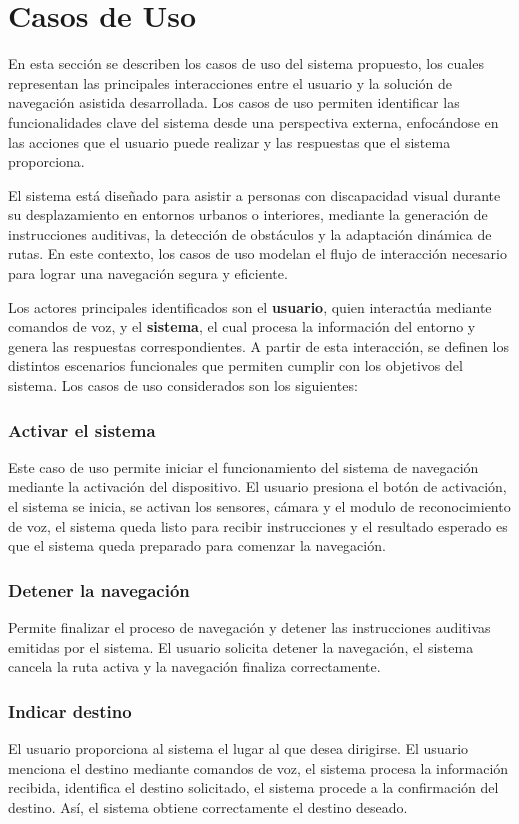 \section{Casos de Uso}
En esta sección se describen los casos de uso del sistema propuesto, los cuales representan las principales interacciones entre el usuario y la solución de navegación asistida desarrollada. Los casos de uso permiten identificar las funcionalidades clave del sistema desde una perspectiva externa, enfocándose en las acciones que el usuario puede realizar y las respuestas que el sistema proporciona.

El sistema está diseñado para asistir a personas con discapacidad visual durante su desplazamiento en entornos urbanos o interiores, mediante la generación de instrucciones auditivas, la detección de obstáculos y la adaptación dinámica de rutas. En este contexto, los casos de uso modelan el flujo de interacción necesario para lograr una navegación segura y eficiente.

Los actores principales identificados son el \textbf{usuario}, quien interactúa mediante comandos de voz, y el \textbf{sistema}, el cual procesa la información del entorno y genera las respuestas correspondientes. A partir de esta interacción, se definen los distintos escenarios funcionales que permiten cumplir con los objetivos del sistema.
Los casos de uso considerados son los siguientes:
\subsubsection{Activar el sistema} 
Este caso de uso permite iniciar el funcionamiento del sistema de navegación mediante la activación del dispositivo.
El usuario presiona el botón de activación, el sistema se inicia, se activan los sensores, cámara y el modulo de reconocimiento de voz, el sistema queda listo para recibir instrucciones y el resultado esperado es que el sistema queda preparado para comenzar la navegación.
\subsubsection{Detener la navegación}
Permite finalizar el proceso de navegación y detener las instrucciones auditivas emitidas por el sistema.
El usuario solicita detener la navegación, el sistema cancela la ruta activa
y la navegación finaliza correctamente.
\subsubsection {Indicar destino}
El usuario proporciona al sistema el lugar al que desea dirigirse.
El usuario menciona el destino mediante comandos de voz, el sistema procesa la información recibida, identifica el destino solicitado, el sistema procede a la confirmación del destino. Así, el sistema obtiene correctamente el destino deseado.
